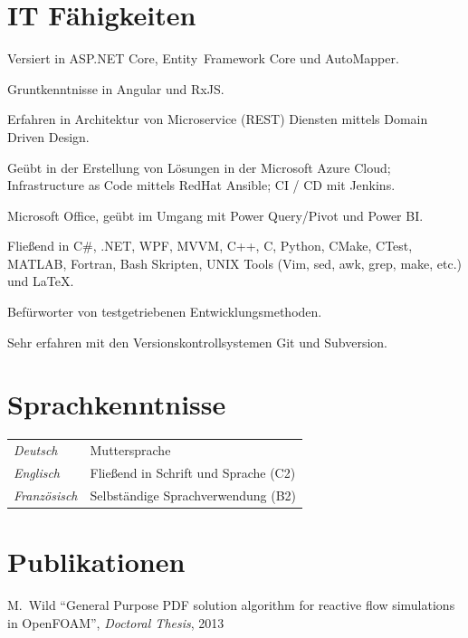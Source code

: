 \documentclass[line,11pt,a4paper]{resume}
\begin{document}
\begin{resume}
\section{\mysidestyle IT Fähigkeiten}\vspace{6mm}
\begin{list2}
  \item Versiert in ASP.NET Core, Entity~Framework Core und AutoMapper.
  \item Gruntkenntnisse in Angular und RxJS.
  \item Erfahren in Architektur von Microservice (REST) Diensten mittels Domain
    Driven Design.
  \item Geübt in der Erstellung von Lösungen in der Microsoft Azure Cloud;
    Infrastructure as Code mittels RedHat Ansible; CI / CD mit Jenkins.
  \item Microsoft Office, geübt im Umgang mit Power Query/Pivot und Power BI.
  \item Flie{\ss}end in C\#, .NET, WPF, MVVM, C++, C, Python, CMake, CTest,
    MATLAB, Fortran, Bash Skripten, UNIX Tools (Vim, sed, awk, grep, make,
    etc.) und {\selectfont\LaTeX}.
  \item Befürworter von testgetriebenen Entwicklungsmethoden.
  \item Sehr erfahren mit den Versionskontrollsystemen Git und Subversion.
\end{list2}

\section{\mysidestyle Sprachkenntnisse}\vspace{2mm}
\begin{tabular}{@{}ll}
  \textsl{Deutsch}     & Muttersprache \\
  \textsl{Englisch}    & Flie{\ss}end in Schrift und Sprache (C2) \\
  \textsl{Französisch} & Selbständige Sprachverwendung (B2) \\
\end{tabular}

\section{\mysidestyle Publikationen}\vspace{2mm}
M.~Wild
``General Purpose PDF solution algorithm for reactive flow simulations in
OpenFOAM'', \textsl{Doctoral Thesis}, 2013


\end{resume}
\end{document}
